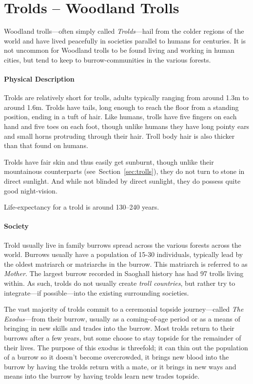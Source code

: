 \section{Trolds -- Woodland Trolls}
Woodland trolls---often simply called \textit{Trolds}---hail from the colder regions of the world and have lived peacefully in societies parallel to humans for centuries.
It is not uncommon for Woodland trolls to be found living and working in human cities, but tend to keep to burrow-communities in the various forests.

\paragraph{Physical Description}
Trolds are relatively short for trolls, adults typically ranging from around 1.3m to around 1.6m.
Trolds have tails, long enough to reach the floor from a standing position, ending in a tuft of hair.
Like humans, trolls have five fingers on each hand and five toes on each foot, though unlike humans they have long pointy ears and small horns protruding through their hair.
Troll body hair is also thicker than that found on humans.

Trolds have fair skin and thus easily get sunburnt, though unlike their mountainous counterparts (see~Section~\ref{sec:trolls}), they do not turn to stone in direct sunlight.
And while not blinded by direct sunlight, they do possess quite good night-vision.

Life-expectancy for a trold is around 130--240 years.

\paragraph{Society}
Trold usually live in family burrows spread across the various forests across the world.
Burrows usually have a population of 15-30 individuals, typically lead by the oldest matriarch or matriarchs in the burrow. 
This matriarch is referred to as \textit{Mother}.
The largest burrow recorded in Saoghall history has had 97 trolls living within.
As such, trolds do not usually create \textit{troll countries}, but rather try to integrate---if possible---into the existing surrounding societies.

The vast majority of trolds commit to a ceremonial topside journey---called \textit{The Exodus}---from their burrow, usually as a coming-of-age period or as a means of bringing in new skills and trades into the burrow.
Most trolds return to their burrows after a few years, but some choose to stay topside for the remainder of their lives.
The purpose of this exodus is threefold; it can thin out the population of a burrow so it doesn't become overcrowded, it brings new blood into the burrow by having the trolds return with a mate, or it brings in new ways and means into the burrow by having trolds learn new trades topside.

